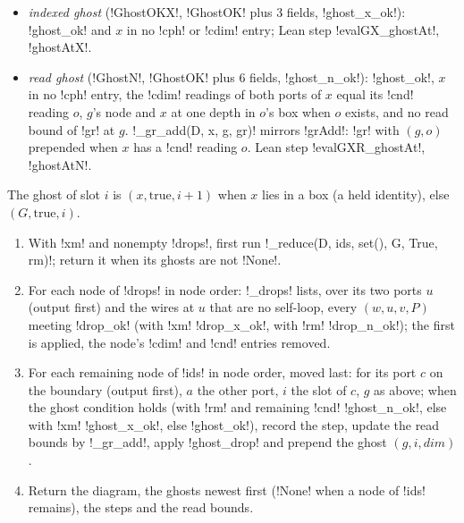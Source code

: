 {{{\begin{itemize}
drops $x$'s \lexcode!cdim! and \lexcode!cnd! entries; Lean step \lexlean!evalG_ghostAt!.
\item \emph{indexed ghost} (\lexlean!GhostOKX!, \lexlean!GhostOK! plus 3 fields, \lexpy!ghost_x_ok!):
\lexpy!ghost_ok! and $x$ in no \lexcode!cph! or \lexcode!cdim! entry; Lean step \lexlean!evalGX_ghostAt!,
\lexlean!ghostAtX!.
\item \emph{read ghost} (\lexlean!GhostN!, \lexlean!GhostOK! plus 6 fields, \lexpy!ghost_n_ok!):
\lexpy!ghost_ok!, $x$ in no \lexcode!cph! entry, the \lexcode!cdim! readings of both ports of $x$ equal
its \lexcode!cnd! reading $o$, $g$'s node and $x$ at one depth in $o$'s box when $o$ exists, and no
read bound of \lexcode!gr! at $g$. \lexpy!_gr_add(D, x, g, gr)! mirrors \lexlean!grAdd!: \lexcode!gr! with
$(g, o)$ prepended when $x$ has a \lexcode!cnd! reading $o$. Lean step \lexlean!evalGXR_ghostAt!,
\lexlean!ghostAtN!.
\end{itemize}
The ghost of slot $i$ is $(x, \mathrm{true}, i+1)$ when $x$ lies in a box (a held identity), else
$(G, \mathrm{true}, i)$.

\begin{algorithm}[\texttt{\_reduce(D, ids, drops, G, xm=False, rm=False)}]\label{alg:lean-export-reduce}
\begin{enumerate}
\item With \lexcode!xm! and nonempty \lexcode!drops!, first run \lexpy!_reduce(D, ids, set(), G, True, rm)!;
return it when its ghosts are not \lexpy!None!.
\item For each node of \lexcode!drops! in node order: \lexpy!_drops! lists, over its two ports $u$ (output
first) and the wires at $u$ that are no self-loop, every $(w, u, v, P)$ meeting \lexpy!drop_ok!
(with \lexcode!xm! \lexpy!drop_x_ok!, with \lexcode!rm! \lexpy!drop_n_ok!); the first is applied, the node's
\lexcode!cdim! and \lexcode!cnd! entries removed.
\item For each remaining node of \lexcode!ids! in node order, moved last: for its port $c$ on the
boundary (output first), $a$ the other port, $i$ the slot of $c$, $g$ as above; when the ghost
condition holds (with \lexcode!rm! and remaining \lexcode!cnd! \lexpy!ghost_n_ok!, else with \lexcode!xm!
\lexpy!ghost_x_ok!, else \lexpy!ghost_ok!), record the step, update the read bounds by \lexpy!_gr_add!,
apply \lexpy!ghost_drop! and prepend the ghost $(g, i, \mathit{dim})$.
\item Return the diagram, the ghosts newest first (\lexpy!None! when a node of \lexcode!ids! remains),
the steps and the read bounds.
\end{enumerate}
\end{algorithm}

}}}
